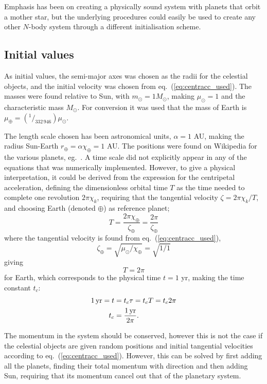 \documentclass[a4paper,11pt]{article}
\begin{document}
Emphasis has been on creating a physically sound system with planets that orbit a mother star, but the underlying procedures could easily be used to create any other $N$-body system through a different initialisation scheme. 

\subsection{Initial values}
As initial values, the semi-major axes was chosen as the radii for the celestial objects, and the initial velocity was chosen from eq.~(\ref{eq:centracc_used}). The masses were found relative to Sun, with $m_\odot = 1 M_\odot$, making $\mu_\odot = 1$ and the characteristic mass $M_\odot$. For conversion it was used that the mass of Earth is $\mu_\oplus = (^1\!/_{332\,946}) \mu_\odot$.

The length scale chosen has been astronomical units, $\alpha = 1$ AU, making the radius Sun-Earth $r_{\oplus} = \alpha \chi_\oplus = 1$ AU. The positions were found on Wikipedia for the various planets, eg.~\cite{Wiki:Saturn}. A time scale did not explicitly appear in any of the equations that was numerically implemented. However, to give a physical interpretation, it could be derived from the expression for the centripetal acceleration, defining the dimensionless orbital time $T$ as the time needed to complete one revolution $2 \pi \chi_k$, requiring that the tangential velocity $\zeta = 2\pi \chi_k / T$, and choosing Earth (denoted $\oplus$) as reference planet;
\[ T = \frac{2\pi \chi_\oplus}{\zeta_\oplus} = \frac{2 \pi}{\zeta_\oplus} \]
where the tangential velocity is found from eq.~(\ref{eq:centracc_used}),
\[ \zeta_\oplus = \sqrt{\mu_\odot/\chi_\oplus} = \sqrt{1/1} \]
giving
\[ T = 2\pi \]
for Earth, which corresponds to the physical time $t = 1$ yr, making the time constant $t_c$:
\begin{align}
    1\, {\rm yr} = t &= t_c \tau = t_c T = t_c 2\pi \notag \\
    t_c &= \frac{1\rm\, yr}{2\pi}. 
    \label{eq:time}
\end{align}

The momentum in the system should be conserved, however this is not the case if the celestial objects are given random positions and initial tangential velocities according to eq.~(\ref{eq:centracc_used}). However, this can be solved by first adding all the planets, finding their total momentum with direction and then adding Sun, requiring that its momentum cancel out that of the planetary system.
\end{document}
